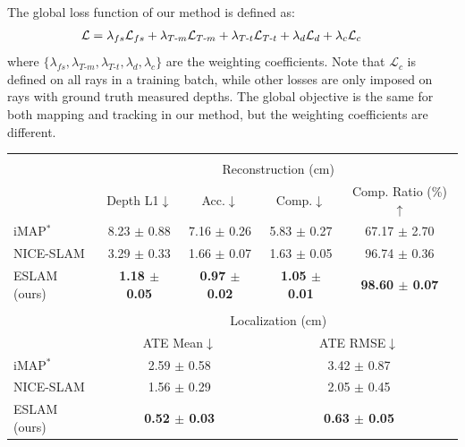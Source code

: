 The global loss function of our method is defined as:
\begin{align}
	\hspace{-0.75em} \mathcal{L} &= \lambda_{fs}\mathcal{L}_{fs} + \lambda_{T\text{-}m}\mathcal{L}_{T\text{-}m} + \lambda_{T\text{-}t}\mathcal{L}_{T\text{-}t} + \lambda_{d}\mathcal{L}_{d} + \lambda_{c}\mathcal{L}_{c}
\end{align}
where $\{\lambda_{fs}, \lambda_{T\text{-}m}, \lambda_{T\text{-}t}, \lambda_{d}, \lambda_{c}\}$ are the weighting coefficients. Note that $\mathcal{L}_{c}$ is defined on all rays in a training batch, while other losses are only imposed on rays with ground truth measured depths. The global objective is the same for both mapping and tracking in our method, but the weighting coefficients are different.

\begin{table}[t]
    \begin{center}
        \begin{tabular}{l|cccc}
            \Xhline{2\arrayrulewidth}
            \multirow{3}{*}{Method} \\
            & \multicolumn{4}{c}{Reconstruction (cm)} \\
            & Depth L1$\downarrow$ & Acc.$\downarrow$ & Comp.$\downarrow$ & Comp. Ratio (\%)$\uparrow$ \\
            
            \hline
            iMAP$^{*}$~\cite{sucar2021imap} & 8.23 $\pm$ 0.88 & 7.16 $\pm$ 0.26 & 5.83 $\pm$ 0.27 & 67.17 $\pm$ 2.70 \\
            NICE-SLAM~\cite{zhu2022nice} & 3.29 $\pm$ 0.33 & 1.66 $\pm$ 0.07 & 1.63 $\pm$ 0.05 & 96.74 $\pm$ 0.36 \\
            ESLAM (ours) & \textbf{1.18 $\pm$ 0.05} & \textbf{0.97 $\pm$ 0.02} & \textbf{1.05 $\pm$ 0.01} & \textbf{98.60 $\pm$ 0.07} \\

            \cline{2-5}
            \\
            & \multicolumn{4}{c}{Localization (cm)} \\
            & \multicolumn{2}{c}{ATE Mean$\downarrow$} & \multicolumn{2}{c}{ATE RMSE$\downarrow$} \\
            \cline{2-5}
            iMAP$^{*}$~\cite{sucar2021imap} & \multicolumn{2}{c}{2.59 $\pm$ 0.58} & \multicolumn{2}{c}{3.42 $\pm$ 0.87} \\
            NICE-SLAM~\cite{zhu2022nice} & \multicolumn{2}{c}{1.56 $\pm$ 0.29} & \multicolumn{2}{c}{2.05 $\pm$ 0.45} \\
            ESLAM (ours) & \multicolumn{2}{c}{\textbf{0.52 $\pm$ 0.03}} & \multicolumn{2}{c}{\textbf{0.63 $\pm$ 0.05}} \\
            

\end{tabular}
\end{center}
\end{table}
